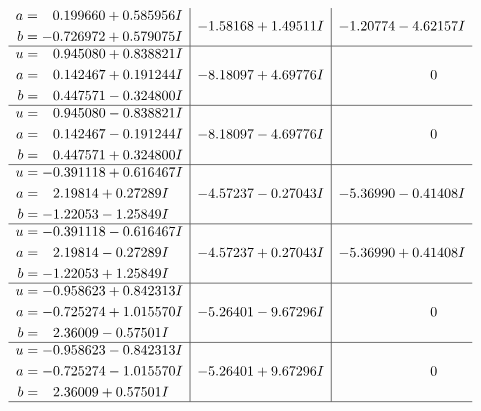\documentclass[1p]{elsarticle_modified}
\theoremstyle{definition}
\begin{document}
$$\begin{array}{c|c|c}
\begin{aligned}
a &= \phantom{-}0.199660 + 0.585956 I \\
b &= -0.726972 + 0.579075 I\end{aligned}
 & -1.58168 + 1.49511 I & -1.20774 - 4.62157 I \\ \hline\begin{aligned}
u &= \phantom{-}0.945080 + 0.838821 I \\
a &= \phantom{-}0.142467 + 0.191244 I \\
b &= \phantom{-}0.447571 - 0.324800 I\end{aligned}
 & -8.18097 + 4.69776 I & \phantom{-0.000000 } 0 \\ \hline\begin{aligned}
u &= \phantom{-}0.945080 - 0.838821 I \\
a &= \phantom{-}0.142467 - 0.191244 I \\
b &= \phantom{-}0.447571 + 0.324800 I\end{aligned}
 & -8.18097 - 4.69776 I & \phantom{-0.000000 } 0 \\ \hline\begin{aligned}
u &= -0.391118 + 0.616467 I \\
a &= \phantom{-}2.19814 + 0.27289 I \\
b &= -1.22053 - 1.25849 I\end{aligned}
 & -4.57237 - 0.27043 I & -5.36990 - 0.41408 I \\ \hline\begin{aligned}
u &= -0.391118 - 0.616467 I \\
a &= \phantom{-}2.19814 - 0.27289 I \\
b &= -1.22053 + 1.25849 I\end{aligned}
 & -4.57237 + 0.27043 I & -5.36990 + 0.41408 I \\ \hline\begin{aligned}
u &= -0.958623 + 0.842313 I \\
a &= -0.725274 + 1.015570 I \\
b &= \phantom{-}2.36009 - 0.57501 I\end{aligned}
 & -5.26401 - 9.67296 I & \phantom{-0.000000 } 0 \\ \hline\begin{aligned}
u &= -0.958623 - 0.842313 I \\
a &= -0.725274 - 1.015570 I \\
b &= \phantom{-}2.36009 + 0.57501 I\end{aligned}
 & -5.26401 + 9.67296 I & \phantom{-0.000000 } 0\\
 \hline 

\end{array}$$
\end{document}
